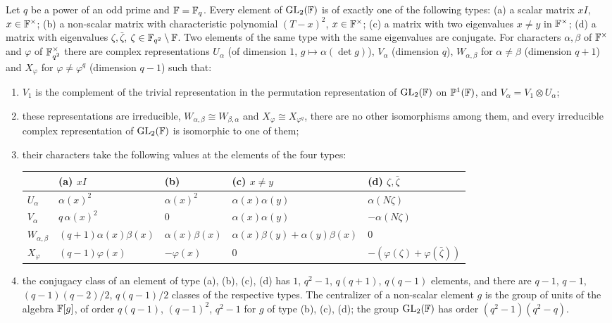 \begin{theorem}\label{thm:prelim:gl2}
Let $q$ be a power of an odd prime and $\mathbb F=\mathbb F_q$. Every element of
$\mathrm{GL}_2(\mathbb F)$ is of exactly one of the following types:
\textup{(a)} a scalar matrix $xI$, $x\in\mathbb F^\times$; \textup{(b)} a
non-scalar matrix with characteristic polynomial $(T-x)^2$, $x\in\mathbb F^\times$;
\textup{(c)} a matrix with two eigenvalues $x\ne y$ in $\mathbb F^\times$;
\textup{(d)} a matrix with eigenvalues $\zeta,\bar\zeta$,
$\zeta\in\mathbb F_{q^2}\setminus\mathbb F$. Two elements of the same type with the same
eigenvalues are conjugate. For characters $\alpha,\beta$ of $\mathbb F^\times$ and
$\varphi$ of $\mathbb F_{q^2}^\times$ there are complex representations $U_\alpha$
(of dimension $1$, $g\mapsto\alpha(\det g)$), $V_\alpha$ (dimension $q$),
$W_{\alpha,\beta}$ for $\alpha\ne\beta$ (dimension $q+1$) and $X_\varphi$ for
$\varphi\ne\varphi^q$ (dimension $q-1$) such that:
\begin{enumerate}[label=\textup{(\roman*)}]
\item $V_1$ is the complement of the trivial representation in the
  permutation representation of $\mathrm{GL}_2(\mathbb F)$ on $\mathbb P^1(\mathbb F)$, and
  $V_\alpha=V_1\otimes U_\alpha$;
\item these representations are irreducible, $W_{\alpha,\beta}\cong
  W_{\beta,\alpha}$ and $X_\varphi\cong X_{\varphi^q}$, there are no other
  isomorphisms among them, and every irreducible complex representation of
  $\mathrm{GL}_2(\mathbb F)$ is isomorphic to one of them;
\item their characters take the following values at the elements of the four
  types:
\begin{center}\small
\begin{tabular}{@{}lllll@{}}
\toprule
 & (a) $xI$ & (b) & (c) $x\ne y$ & (d) $\zeta,\bar\zeta$\\
\midrule
$U_\alpha$ & $\alpha(x)^2$ & $\alpha(x)^2$ & $\alpha(x)\alpha(y)$ & $\alpha(N\zeta)$\\
$V_\alpha$ & $q\,\alpha(x)^2$ & $0$ & $\alpha(x)\alpha(y)$ & $-\alpha(N\zeta)$\\
$W_{\alpha,\beta}$ & $(q+1)\alpha(x)\beta(x)$ & $\alpha(x)\beta(x)$ & $\alpha(x)\beta(y)+\alpha(y)\beta(x)$ & $0$\\
$X_\varphi$ & $(q-1)\varphi(x)$ & $-\varphi(x)$ & $0$ & $-(\varphi(\zeta)+\varphi(\bar\zeta))$\\
\bottomrule
\end{tabular}
\end{center}
\item the conjugacy class of an element of type \textup{(a)}, \textup{(b)},
  \textup{(c)}, \textup{(d)} has $1$, $q^2-1$, $q(q+1)$, $q(q-1)$ elements,
  and there are $q-1$, $q-1$, $(q-1)(q-2)/2$, $q(q-1)/2$ classes of the
  respective types. The centralizer of a non-scalar element $g$ is the
  group of units of the algebra $\mathbb F[g]$, of order $q(q-1)$, $(q-1)^2$,
  $q^2-1$ for $g$ of type \textup{(b)}, \textup{(c)}, \textup{(d)}; the
  group $\mathrm{GL}_2(\mathbb F)$ has order $(q^2-1)(q^2-q)$.
\end{enumerate}
\end{theorem}


